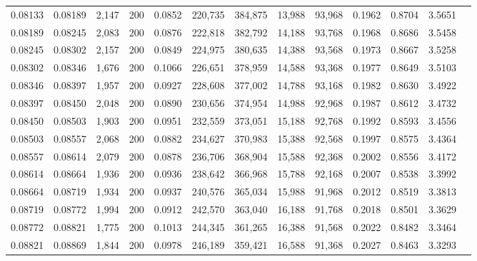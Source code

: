 \begin{tabular}{rrrrrrrrrrrrr}
0.08133 & 0.08189 & 2,147 & 200 &                                     0.0852 & 220,735 & 384,875 &  13,988 &  93,968 & 0.1962 & 0.8704 & 3.5651 \\
0.08189 & 0.08245 & 2,083 & 200 &                                     0.0876 & 222,818 & 382,792 &  14,188 &  93,768 & 0.1968 & 0.8686 & 3.5458 \\
0.08245 & 0.08302 & 2,157 & 200 &                                     0.0849 & 224,975 & 380,635 &  14,388 &  93,568 & 0.1973 & 0.8667 & 3.5258 \\
0.08302 & 0.08346 & 1,676 & 200 &                                     0.1066 & 226,651 & 378,959 &  14,588 &  93,368 & 0.1977 & 0.8649 & 3.5103 \\
0.08346 & 0.08397 & 1,957 & 200 &                                     0.0927 & 228,608 & 377,002 &  14,788 &  93,168 & 0.1982 & 0.8630 & 3.4922 \\
0.08397 & 0.08450 & 2,048 & 200 &                                     0.0890 & 230,656 & 374,954 &  14,988 &  92,968 & 0.1987 & 0.8612 & 3.4732 \\
0.08450 & 0.08503 & 1,903 & 200 &                                     0.0951 & 232,559 & 373,051 &  15,188 &  92,768 & 0.1992 & 0.8593 & 3.4556 \\
0.08503 & 0.08557 & 2,068 & 200 &                                     0.0882 & 234,627 & 370,983 &  15,388 &  92,568 & 0.1997 & 0.8575 & 3.4364 \\
0.08557 & 0.08614 & 2,079 & 200 &                                     0.0878 & 236,706 & 368,904 &  15,588 &  92,368 & 0.2002 & 0.8556 & 3.4172 \\
0.08614 & 0.08664 & 1,936 & 200 &                                     0.0936 & 238,642 & 366,968 &  15,788 &  92,168 & 0.2007 & 0.8538 & 3.3992 \\
0.08664 & 0.08719 & 1,934 & 200 &                                     0.0937 & 240,576 & 365,034 &  15,988 &  91,968 & 0.2012 & 0.8519 & 3.3813 \\
0.08719 & 0.08772 & 1,994 & 200 &                                     0.0912 & 242,570 & 363,040 &  16,188 &  91,768 & 0.2018 & 0.8501 & 3.3629 \\
0.08772 & 0.08821 & 1,775 & 200 &                                     0.1013 & 244,345 & 361,265 &  16,388 &  91,568 & 0.2022 & 0.8482 & 3.3464 \\
0.08821 & 0.08869 & 1,844 & 200 &                                     0.0978 & 246,189 & 359,421 &  16,588 &  91,368 & 0.2027 & 0.8463 & 3.3293 \\

\end{tabular}
